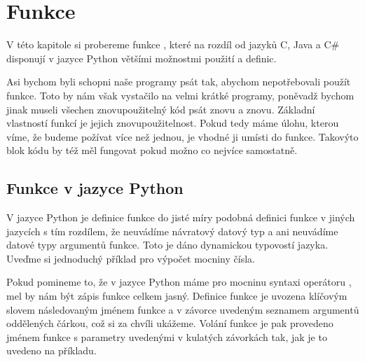 \chapter{Funkce}%

V této kapitole si probereme funkce%
, které na rozdíl od jazyků C, Java a C\# disponují
v jazyce Python většími možnostmi použití a definic.

Asi bychom byli schopni naše programy psát tak, abychom nepotřebovali použít funkce.
Toto by nám však vystačilo na velmi krátké programy, poněvadž bychom jinak museli všechen
znovupoužitelný kód psát znovu a znovu.
%
Základní vlastností funkcí je jejich znovupoužitelnost. Pokud tedy máme úlohu,
kterou víme, že budeme požívat více než jednou, je vhodné ji umísti do funkce. Takovýto
blok kódu by též měl fungovat pokud možno co nejvíce samostatně. %



\section{Funkce v jazyce Python}

V jazyce Python je definice funkce do jisté míry podobná definici funkce v jiných jazycích s tím rozdílem,
že neuvádíme návratový datový typ a ani neuvádíme datové typy argumentů funkce. Toto je dáno
dynamickou typovostí jazyka. Uveďme si jednoduchý příklad pro výpočet mocniny čísla.


Pokud pomineme to, že v jazyce Python máme pro mocninu syntaxi operátoru \kod{**}, mel by nám být
zápis funkce celkem jasný. Definice funkce je uvozena klíčovým slovem  následovaným
jménem funkce a v závorce uvedeným seznamem argumentů oddělených čárkou, což si za chvíli ukážeme.
Volání funkce je pak provedeno jménem funkce s parametry uvedenými v kulatých závorkách tak,
jak je to uvedeno na příkladu.

